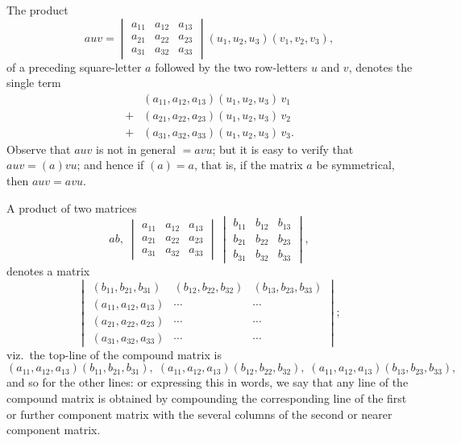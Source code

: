 \documentclass[11pt,a4paper]{article}
\begin{document}
The product
\[
  auv = \begin{vmatrix}
   a_{11} & a_{12} & a_{13} \\
   a_{21} & a_{22} & a_{23} \\
   a_{31} & a_{32} & a_{33}
  \end{vmatrix} (u_{1}, u_{2}, u_{3})(v_{1}, v_{2}, v_{3}),
\]
of a preceding square-letter $a$ followed by the two row-letters $u$ and $v$,
denotes the single term
\begin{align*}
  & (a_{11}, a_{12}, a_{13})(u_{1}, u_{2}, u_{3})\,v_{1} \\
  {} + {} & (a_{21}, a_{22}, a_{23})(u_{1}, u_{2}, u_{3})\,v_{2} \\
  {} + {} & (a_{31}, a_{32}, a_{33})(u_{1}, u_{2}, u_{3})\,v_{3}.
\end{align*}
Observe that $auv$ is not in general $= avu$; but it is easy to verify that
$auv = (a)vu$; and hence if $(a) = a$, that is, if the matrix $a$ be
symmetrical, then $auv = avu$.

A product of two matrices
\[
  ab,\; \begin{vmatrix}
   a_{11} & a_{12} & a_{13} \\
   a_{21} & a_{22} & a_{23} \\
   a_{31} & a_{32} & a_{33}
  \end{vmatrix}\, \begin{vmatrix}
   b_{11} & b_{12} & b_{13} \\
   b_{21} & b_{22} & b_{23} \\
   b_{31} & b_{32} & b_{33}
  \end{vmatrix},
\]
denotes a matrix
\[
  \begin{vmatrix}
   (b_{11}, b_{21}, b_{31}) & (b_{12}, b_{22}, b_{32}) & (b_{13}, b_{23}, b_{33}) \\
   (a_{11}, a_{12}, a_{13}) & \cdots & \cdots \\
   (a_{21}, a_{22}, a_{23}) & \cdots & \cdots \\
   (a_{31}, a_{32}, a_{33}) & \cdots & \cdots
  \end{vmatrix};
\]
viz.\ the top-line of the compound matrix is
\[
  (a_{11}, a_{12}, a_{13})(b_{11}, b_{21}, b_{31}),\;
  (a_{11}, a_{12}, a_{13})(b_{12}, b_{22}, b_{32}),\;
  (a_{11}, a_{12}, a_{13})(b_{13}, b_{23}, b_{33}),
\]
and so for the other lines: or expressing this in words, we say that any
line of the compound matrix is obtained by compounding the corresponding
line of the first or further component matrix with the several columns of
the second or nearer component matrix.
\end{document}
